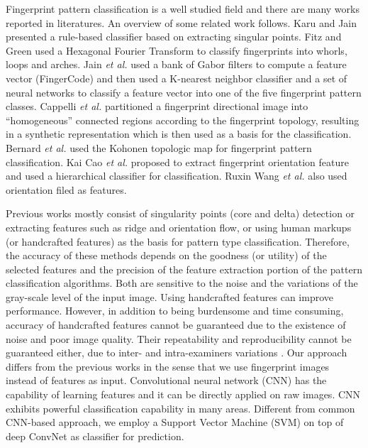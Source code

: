 %
Fingerprint pattern classification is a well studied field and there are many works reported in literatures.  An overview of some related work follows.
%
Karu and Jain \cite{karuJain1996} presented a rule-based classifier based on extracting singular points. 
%
Fitz and Green \cite{FitzGreen1996} used a Hexagonal Fourier Transform to classify fingerprints into whorls, loops and arches. 
%
Jain \textit{et al.} \cite{JainSalil1999} used a bank of Gabor filters to compute a feature vector (FingerCode) and then used a K-nearest neighbor classifier and a set of neural networks to classify a feature vector into one of the five fingerprint pattern classes.
%
Cappelli \textit{et al.} \cite{cappelli1999} partitioned a fingerprint directional image into ``homogeneous'' connected regions according to the fingerprint topology, resulting in a synthetic representation which is then used as a basis for the classification.
%
Bernard \textit{et al.} \cite{Bernard2001} used the Kohonen topologic map for fingerprint pattern classification. 
%
Kai Cao \textit{et al.}\cite{cao2013fingerprint} proposed to extract fingerprint orientation feature and used a hierarchical classifier for classification.
%
Ruxin Wang \textit{et al.} \cite{wang2014fingerprint} also used orientation filed as features. %


Previous works mostly consist of singularity points (core and delta) detection or extracting features such as ridge and orientation flow, or using human markups (or handcrafted features) as the basis for pattern type classification. 
%
Therefore, the accuracy of these methods depends on the goodness (or utility) of the selected features and the precision of the feature extraction portion of the pattern classification algorithms. Both are sensitive to the noise and the variations of the gray-scale level of the input image.  
%
Using handcrafted features can improve performance.  However, in addition to being burdensome and time consuming, accuracy of handcrafted features cannot be guaranteed due to the existence of noise and poor image quality. 
%
Their repeatability and reproducibility cannot be guaranteed either, due to inter- and intra-examiners variations \cite{fbiBlackbox}.  
%
Our approach differs from the previous works in the sense that we use fingerprint images instead of features as input. Convolutional neural network (CNN) has the capability of learning features and it can be directly applied on raw images. CNN exhibits powerful classification capability in many areas\cite{lecun2015deep}\cite{szegedy2016rethinking}.
%
Different from common CNN-based approach, we employ a Support Vector Machine (SVM) on top of deep ConvNet as classifier for prediction.


